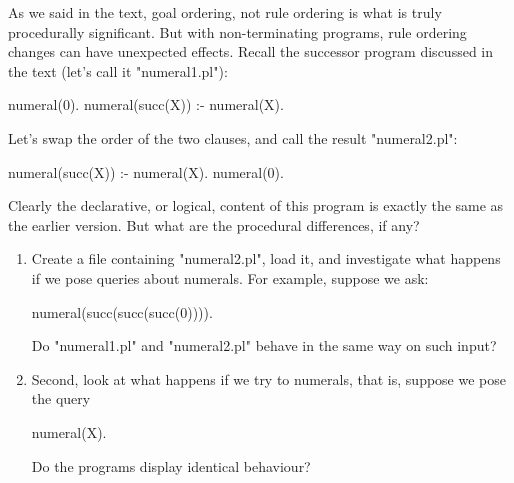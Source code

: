 As we said in the text, goal ordering, not rule ordering is
what is truly  procedurally significant.  But with non-terminating programs,
rule ordering changes can have unexpected effects.  Recall the
successor program discussed in the text (let's call it "numeral1.pl"):
\begin{LPNcodedisplay}
numeral(0).
numeral(succ(X)) :- numeral(X).
\end{LPNcodedisplay}
Let's  swap the order of the two clauses, and
call the result "numeral2.pl":
\begin{LPNcodedisplay}
numeral(succ(X)) :- numeral(X).
numeral(0).
\end{LPNcodedisplay}
Clearly the declarative, or logical, content of this program is
exactly the same as the earlier version. But what are the procedural
differences, if any?

\begin{enumerate}

\item{} Create a file containing "numeral2.pl", load it, and
investigate what happens if we pose  queries about
 numerals.
For example, suppose we ask:
\begin{LPNcodedisplay}
numeral(succ(succ(succ(0)))).
\end{LPNcodedisplay}
Do "numeral1.pl" and "numeral2.pl" behave in the same way on such
input?

\item{}
Second, look at what happens if we try to  numerals, that
is, suppose we pose the query
\begin{LPNcodedisplay}
numeral(X).
\end{LPNcodedisplay}
Do the programs display identical behaviour?
\end{enumerate}

